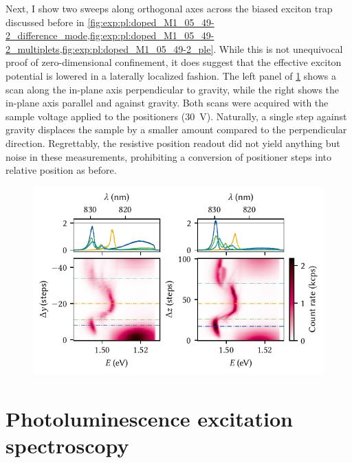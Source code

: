 Next, I show two sweeps along orthogonal axes across the biased exciton trap discussed before in \cref{fig:exp:pl:doped_M1_05_49-2_difference_mode,fig:exp:pl:doped_M1_05_49-2_multiplets,fig:exp:pl:doped_M1_05_49-2_ple}.
While this is not unequivocal proof of zero-dimensional confinement, it does suggest that the effective exciton potential is lowered in a laterally localized fashion. %
The left panel of \cref{fig:exp:pl:doped_M1_05_49-2_positioning} shows a scan along the in-plane axis perpendicular to gravity, while the right shows the in-plane axis parallel and against gravity.
Both scans were acquired with the sample voltage applied to the positioners (\qty{30}{\volt}).
Naturally, a single step against gravity displaces the sample by a smaller amount compared to the perpendicular direction.
Regrettably, the resistive position readout did not yield anything but noise in these measurements, prohibiting a conversion of positioner steps into relative position as before.

\begin{figure}
    \centering
    \includegraphics{img/pdf/experiment/doped_M1_05_49-2_positioning}
    \caption[
        $V_{y}=\qty{30}{\volt}$
        $V_{z}=\qty{30}{\volt}$
        .
        \protect\newline
    ]{
    }
    \label{fig:exp:pl:doped_M1_05_49-2_positioning}
\end{figure}

\section{Photoluminescence excitation spectroscopy}\label{sec:exp:observations:ple}
\cite{Huard2000,Yusa2000}
\cite{Esser2000,Esser2001}

